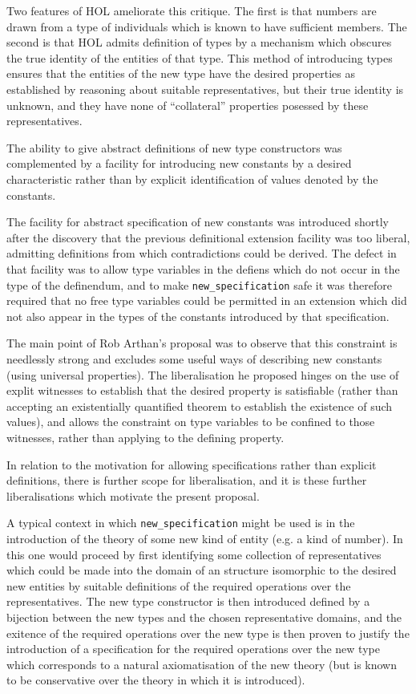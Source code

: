 ﻿\documentclass[12pt]{article}
\def\NewSpec{{\tt new\_specification}}
\begin{document}
Two features of HOL ameliorate this critique.
The first is that numbers are drawn from a type of individuals which is known to have sufficient members.
The second is that HOL admits definition of types by a mechanism which obscures the true identity of the entities of that type.
This method of introducing types ensures that the entities of the new type have the desired properties as established by reasoning about suitable representatives, but their true identity is unknown, and they have none of ``collateral'' properties posessed by these representatives.

The ability to give abstract definitions of new type constructors was complemented by a facility for introducing new constants by a desired characteristic rather than by explicit identification of values denoted by the constants.

The facility for abstract specification of new constants was introduced shortly after the discovery that the previous definitional extension facility was too liberal, admitting definitions from which contradictions could be derived.
The defect in that facility was to allow type variables in the defiens which do not occur in the type of the definendum, and to make {\NewSpec} safe it was therefore required that no free type variables could be permitted in an extension which did not also appear in the types of the constants introduced by that specification.

The main point of Rob Arthan's proposal was to observe that this constraint is needlessly strong and excludes some useful ways of describing new constants (using universal properties).
The liberalisation he proposed hinges on the use of explit witnesses to establish that the desired property is satisfiable (rather than accepting an existentially quantified theorem to establish the existence of such values), and allows the constraint on type variables to be confined to those witnesses, rather than applying to the defining property.

In relation to the motivation for allowing specifications rather than explicit definitions, there is further scope for liberalisation, and it is these further liberalisations which motivate the present proposal.

A typical context in which {\NewSpec} might be used is in the introduction of the theory of some new kind of entity (e.g. a kind of number).
In this one would proceed by first identifying some collection of representatives which could be made into the domain of an structure isomorphic to the desired new entities by suitable definitions of the required operations over the representatives.
The new type constructor is then introduced defined by a bijection between the new types and the chosen representative domains, and the exitence of the required operations over the new type is then proven to justify the introduction of a specification for the required operations over the new type which corresponds to a natural axiomatisation of the new theory (but is known to be conservative over the theory in which it is introduced).
\end{document}
